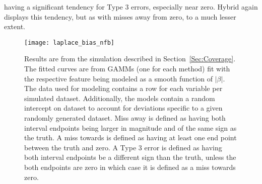 having a significant tendency for Type 3 errors, especially near zero. Hybrid again displays this tendency, but as with misses away from zero, to a much lesser extent.


\begin{figure}[hbtp]
  \texttt{[image: laplace\_bias\_nfb]}
  \caption{\label{Fig:laplace_bias_nfb} Results are from the simulation described in Section~\ref{Sec:Coverage}. The fitted curves are from GAMMs (one for each method) fit with the respective feature being modeled as a smooth function of $|\beta|$. The data used for modeling contains a row for each variable per simulated dataset. Additionally, the models contain a random intercept on dataset to account for deviations specific to a given randomly generated dataset. Miss away is defined as having both interval endpoints being larger in magnitude and of the same sign as the truth. A miss towards is defined as having at least one end point between the truth and zero. A Type 3 error is defined as having both interval endpoints be a different sign than the truth, unless the both endpoints are zero in which case it is defined as a miss towards zero.}
\end{figure}


